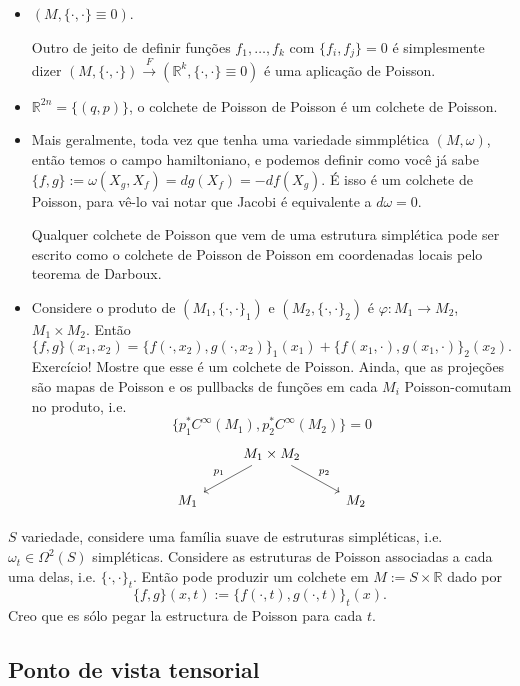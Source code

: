 \begin{example}\leavevmode
\begin{itemize}
\item \((M,\{\cdot ,\cdot \}\equiv0)\).

	Outro de jeito de definir funções \(f_1,\ldots,f_k\) com \(\{f_i,f_j\}=0\) é simplesmente dizer \((M,\{\cdot ,\cdot \})\xrightarrow{F}(\mathbb{R}^k,\{\cdot ,\cdot \} \equiv 0)\) é uma aplicação de Poisson.
\item \(\mathbb{R}^{2n}=\{(q,p)\}\), o colchete de Poisson de Poisson é um colchete de Poisson.
\item Mais geralmente, toda vez que tenha uma variedade simmplética \((M,\omega)\), então temos o campo hamiltoniano, e podemos definir como você já sabe \(\{f,g\}:=\omega(X_g,X_f)=dg(X_f)=-df(X_g)\). É isso é um colchete de Poisson, para vê-lo vai notar que Jacobi é equivalente a \(d\omega=0\).

	Qualquer colchete de Poisson que vem de uma estrutura simplética pode ser escrito como o colchete de Poisson de Poisson em coordenadas locais pelo teorema de Darboux.

\item  Considere o produto de \((M_1,\{\cdot ,\cdot \}_1)\) e \((M_2,\{ \cdot ,\cdot \}_2)\) é \(\varphi:M_1 \to M_2\), \(M_1 \times M_2\). Então
	\[\{f,g\}(x_1,x_2)=\{f(\cdot ,x_2),g(\cdot ,x_2)\}_1(x_1)+\{f(x_1,\cdot ),g(x_1,\cdot )\}_2(x_2).\]
	{\color{2}Exercício!} Mostre que esse é um colchete de Poisson. Ainda, que as projeções são mapas de Poisson e os pullbacks de funções em cada \(M_i\) Poisson-comutam no produto, i.e.
	\[\{p_1^*C^\infty(M_1),p_2^*C^\infty(M_2)\}=0\]
	\[\begin{tikzcd}
	&M_1 \times M_2\arrow[dl,"p_1",swap]\arrow[dr,"p_2"]\\
	M_1&&M_2
	\end{tikzcd}\]
\end{itemize}
\item \(S\) variedade, considere uma família suave de estruturas simpléticas, i.e. \(\omega_t \in \Omega^2(S)\) simpléticas. Considere as estruturas de Poisson associadas a cada uma delas, i.e. \(\{\cdot ,\cdot \}_t\). Então pode produzir um colchete em \(M:=S \times \mathbb{R}\) dado por
	\[\{f,g\}(x,t):=\{f(\cdot ,t),g(\cdot ,t)\}_t(x).\]
	Creo que es sólo pegar la estructura de Poisson para cada \(t\).
\end{example}

\subsection{Ponto de vista tensorial}

